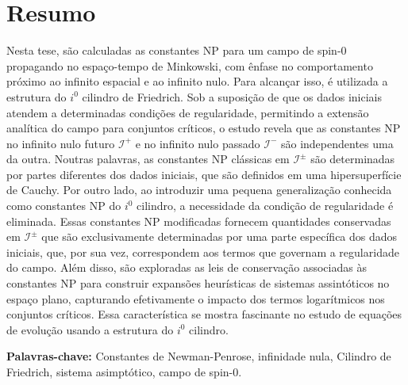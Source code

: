 
\section*{Resumo}


Nesta tese, são calculadas as constantes NP para um campo de spin-0 propagando no espaço-tempo de Minkowski, com ênfase no comportamento próximo ao infinito espacial e ao infinito nulo. Para alcançar isso, é utilizada a estrutura do $i^0$ cilindro de Friedrich. Sob a suposição de que os dados iniciais atendem a determinadas condições de regularidade, permitindo a extensão analítica do campo para conjuntos críticos, o estudo revela que as constantes NP no infinito nulo futuro $\mathscr{I}^{+}$ e no infinito nulo passado $\mathscr{I}^{-}$ são independentes uma da outra. Noutras palavras, as constantes NP clássicas em $\mathscr{I}^{\pm}$ são determinadas por partes diferentes dos dados iniciais, que são definidos em uma hipersuperfície de Cauchy.
Por outro lado, ao introduzir uma pequena generalização conhecida como constantes NP do $i^0$ cilindro, a necessidade da condição de regularidade é eliminada. Essas constantes NP modificadas fornecem quantidades conservadas em $\mathscr{I}^{\pm}$ que são exclusivamente determinadas por uma parte específica dos dados iniciais, que, por sua vez, correspondem aos termos que governam a regularidade do campo. Além disso, são exploradas as leis de conservação associadas às constantes NP para construir expansões heurísticas de sistemas assintóticos no espaço plano, capturando efetivamente o impacto dos termos logarítmicos nos conjuntos críticos. Essa característica se mostra fascinante no estudo de equações de evolução usando a estrutura do $i^0$ cilindro.

\vfill

\textbf{\Large Palavras-chave:} Constantes de Newman-Penrose, infinidade nula, Cilindro de Friedrich, sistema asimptótico, campo de spin-0.

